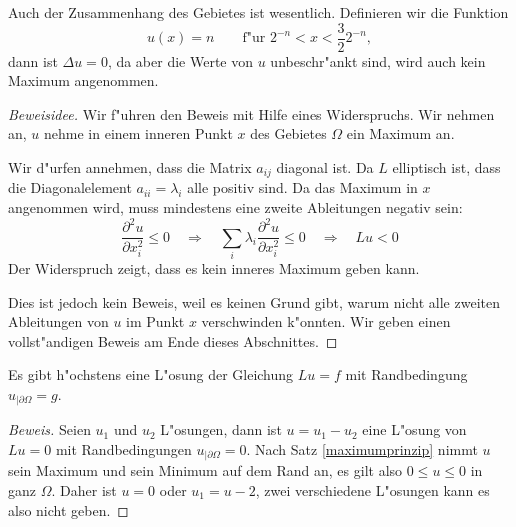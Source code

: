 Auch der Zusammenhang des Gebietes ist wesentlich.  Definieren wir
die Funktion 
\[
u(x)=n\qquad\text{f"ur $2^{-n} < x < \frac{3}{2}2^{-n}$},
\]
dann ist $\Delta u=0$, da aber die Werte von $u$ unbeschr"ankt sind,
wird auch kein Maximum angenommen.

\begin{proof}[Beweisidee]
Wir f"uhren den Beweis mit Hilfe eines Widerspruchs. Wir nehmen
an, $u$ nehme in einem inneren Punkt $x$ des Gebietes $\Omega$ ein
Maximum an.

Wir d"urfen annehmen, dass die Matrix $a_{ij}$ diagonal ist.
Da $L$ elliptisch ist, dass die Diagonalelement $a_{ii}=\lambda_i$
alle positiv sind. Da das Maximum in $x$ angenommen wird, muss
mindestens eine zweite Ableitungen negativ sein:
\[
\frac{\partial^2u}{\partial x_i^2}
\le 0
\quad
\Rightarrow
\quad
\sum_{i}\lambda_i \frac{\partial^2u}{\partial x_i^2} \le 0
\quad
\Rightarrow
\quad
Lu<0
\]
Der Widerspruch zeigt, dass es kein inneres Maximum geben kann.

Dies ist jedoch kein Beweis, weil es keinen Grund gibt, warum
nicht alle zweiten Ableitungen von $u$ im Punkt $x$ verschwinden
k"onnten. Wir geben einen vollst"andigen Beweis am Ende dieses
Abschnittes.
\end{proof}

\begin{satz}
Es gibt h"ochstens eine L"osung der Gleichung
$Lu=f$ 
mit Randbedingung
$u_{|\partial\Omega}=g$.
\end{satz}

\begin{proof}[Beweis]
Seien $u_1$ und $u_2$ L"osungen, dann ist $u=u_1-u_2$ eine L"osung 
von $Lu=0$ mit Randbedingungen $u_{|\partial\Omega}=0$. Nach Satz
\ref{maximumprinzip} nimmt $u$ sein Maximum und sein Minimum auf dem Rand an,
es gilt
also $0\le u\le 0$ in ganz $\Omega$.
Daher ist $u=0$ oder $u_1=u-2$,
zwei verschiedene L"osungen kann es also nicht geben.
\end{proof}

